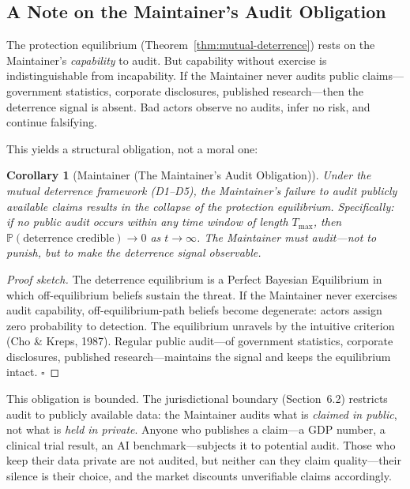 \documentclass[12pt,a4paper]{article}
\newtheorem{corollary}[theorem]{Corollary}
\theoremstyle{definition}
\theoremstyle{remark}
\begin{document}
\subsection{A Note on the Maintainer's Audit Obligation}

The protection equilibrium (Theorem~\ref{thm:mutual-deterrence}) rests on the Maintainer's \textit{capability} to audit. But capability without exercise is indistinguishable from incapability. If the Maintainer never audits public claims—government statistics, corporate disclosures, published research—then the deterrence signal is absent. Bad actors observe no audits, infer no risk, and continue falsifying.

This yields a structural obligation, not a moral one:

\begin{corollary}[Maintainer (The Maintainer's Audit Obligation)]
\label{cor:audit-obligation}
Under the mutual deterrence framework (D1--D5), the Maintainer's failure to audit publicly available claims results in the collapse of the protection equilibrium. Specifically: if no public audit occurs within any time window of length $T_{\max}$, then $\mathbb{P}(\text{deterrence credible}) \to 0$ as $t \to \infty$. The Maintainer must audit—not to punish, but to make the deterrence signal observable.
\end{corollary}

\begin{proof}[Proof sketch]
The deterrence equilibrium is a Perfect Bayesian Equilibrium in which off-equilibrium beliefs sustain the threat. If the Maintainer never exercises audit capability, off-equilibrium-path beliefs become degenerate: actors assign zero probability to detection. The equilibrium unravels by the intuitive criterion (Cho \& Kreps, 1987). Regular public audit—of government statistics, corporate disclosures, published research—maintains the signal and keeps the equilibrium intact. $\square$
\end{proof}

This obligation is bounded. The jurisdictional boundary (Section~6.2) restricts audit to publicly available data: the Maintainer audits what is \textit{claimed in public}, not what is \textit{held in private}. Anyone who publishes a claim—a GDP number, a clinical trial result, an AI benchmark—subjects it to potential audit. Those who keep their data private are not audited, but neither can they claim quality—their silence is their choice, and the market discounts unverifiable claims accordingly.
\end{document}
